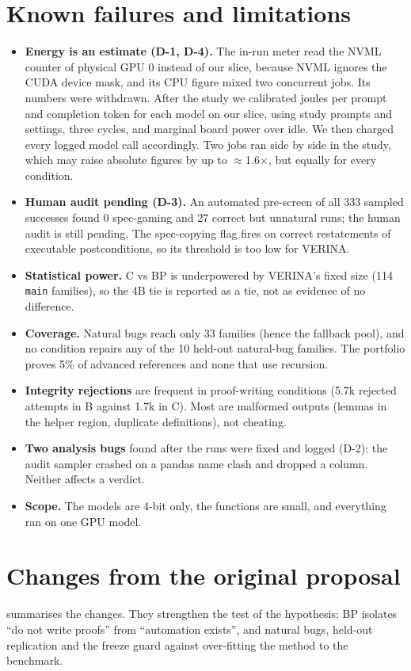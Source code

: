 \documentclass[10pt,twocolumn]{article}
\begin{document}
\section{Known failures and limitations}
\begin{itemize}
\item \textbf{Energy is an estimate (D-1, D-4).} The in-run meter read the NVML counter of physical GPU 0
instead of our slice, because NVML ignores the CUDA device mask, and its CPU figure mixed two concurrent jobs.
Its numbers were withdrawn. After the study we calibrated joules per prompt and completion token for each model
on our slice, using study prompts and settings, three cycles, and marginal board power over idle. We then charged
every logged model call accordingly. Two jobs ran side by side in the study, which may raise absolute figures by
up to $\approx$1.6$\times$, but equally for every condition.
\item \textbf{Human audit pending (D-3).} An automated pre-screen of all 333 sampled successes found 0
spec-gaming and 27 correct but unnatural runs; the human audit is still pending. The spec-copying flag fires on correct
restatements of executable postconditions, so its threshold is too low for VERINA.
\item \textbf{Statistical power.} C vs BP is underpowered by VERINA's fixed size (114 \texttt{main} families), so the
4B tie is reported as a tie, not as evidence of no difference.
\item \textbf{Coverage.} Natural bugs reach only 33 families (hence the fallback pool), and no condition repairs
any of the 10 held-out natural-bug families. The portfolio proves 5\% of advanced references and none that use
recursion.
\item \textbf{Integrity rejections} are frequent in proof-writing conditions (5.7k rejected attempts in B against
1.7k in C). Most are malformed outputs (lemmas in the helper region, duplicate definitions), not cheating.
\item \textbf{Two analysis bugs} found after the runs were fixed and logged (D-2): the audit sampler crashed on a
pandas name clash and dropped a column. Neither affects a verdict.
\item \textbf{Scope.} The models are 4-bit only, the functions are small, and everything ran on one GPU model.
\end{itemize}

\section{Changes from the original proposal}
 summarises the changes. They strengthen the test of the hypothesis: BP isolates ``do not
write proofs'' from ``automation exists'', and natural bugs, held-out replication and the freeze guard against
over-fitting the method to the benchmark.
\end{document}
